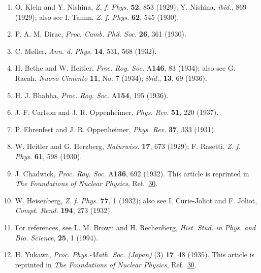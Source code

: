 \begin{enumerate}
\item\label{ref:1.46} O. Klein and Y. Nishina, \emph{Z. f. Phys.} \textbf{52}, 853 (1929);
Y. Nishina, \emph{ibid.}, 869 (1929); also see I. Tamm, \emph{Z. f. Phys.}
\textbf{62}, 545 (1930).

\item\label{ref:1.47} P. A. M. Dirac, \emph{Proc. Camb. Phil. Soc.} \textbf{26}, 361 (1930).

\item\label{ref:1.48} C. M\o ller, \emph{Ann. d. Phys.} \textbf{14}, 531, 568 (1932).

\item\label{ref:1.49} H. Bethe and W. Heitler, \emph{Proc. Roy. Soc.} A\textbf{146}, 83
(1934); also see G. Racah, \emph{Nuovo Cimento} \textbf{11}, No. 7 (1934);
\emph{ibid.}, \textbf{13}, 69 (1936).

\item\label{ref:1.50} H. J. Bhabha, \emph{Proc. Roy. Soc.} A\textbf{154}, 195 (1936).

\item[50a.]\label{ref:1.50a} J. F. Carlson and J. R. Oppenheimer, \emph{Phys. Rev.}
\textbf{51}, 220 (1937).

\item\label{ref:1.51} P. Ehrenfest and J. R. Oppenheimer, \emph{Phys. Rev.} \textbf{37}, 333
(1931).

\item\label{ref:1.52} W. Heitler and G. Herzberg, \emph{Naturwiss.} \textbf{17}, 673 (1929);
F. Rasetti, \emph{Z. f. Phys.} \textbf{61}, 598 (1930).

\item\label{ref:1.53} J. Chadwick, \emph{Proc. Roy. Soc.} A\textbf{136}, 692 (1932). This
article is reprinted in \emph{The Foundations of Nuclear Physics}, Ref.~\hyperref[ref:1.30]{30}.

\item\label{ref:1.54} W. Heisenberg, \emph{Z. f. Phys.} \textbf{77}, 1 (1932); also see I.
Curie-Joliot and F. Joliot, \emph{Compt. Rend.} \textbf{194}, 273 (1932).

\item[54a.]\label{ref:1.54a} For references, see L. M. Brown and H. Rechenberg, \emph{Hist.
Stud. in Phys. and Bio. Science}, \textbf{25}, 1 (1994).

\item\label{ref:1.55} H. Yukawa, \emph{Proc. Phys.-Math. Soc. (Japan)} (3) \textbf{17}, 48
(1935). This article is reprinted in \emph{The Foundations of Nuclear Physics},
Ref.~\hyperref[ref:1.30]{30}.


\end{enumerate}
